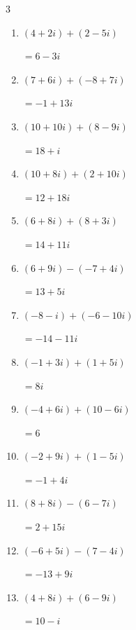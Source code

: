 \begin{multicols}{3}
\begin{enumerate}
  \item $\displaystyle (4+2i) + (2-5i)$

        $\displaystyle =6-3i$

  \item $\displaystyle (7+6i) + (-8+7i)$

        $\displaystyle =-1+13i$

  \item $\displaystyle (10+10i) + (8-9i)$

        $\displaystyle =18+i$

  \item $\displaystyle (10+8i) + (2+10i)$

        $\displaystyle =12+18i$

  \item $\displaystyle (6+8i) + (8+3i)$

        $\displaystyle =14+11i$

  \item $\displaystyle (6+9i) - (-7+4i)$

        $\displaystyle =13+5i$

\columnbreak %

\resetques

  \item $\displaystyle (-8-i) + (-6-10i)$

        $\displaystyle =-14-11i$

  \item $\displaystyle (-1+3i) + (1+5i)$

        $\displaystyle =8i$

  \item $\displaystyle (-4+6i) + (10-6i)$

        $\displaystyle =6$

  \item $\displaystyle (-2+9i) + (1-5i)$

        $\displaystyle =-1+4i$

  \item $\displaystyle (8+8i) - (6-7i)$

        $\displaystyle =2+15i$

  \item $\displaystyle (-6+5i) - (7-4i)$

        $\displaystyle =-13+9i$

  \item $\displaystyle (4+8i) + (6-9i)$

        $\displaystyle =10-i$


\end{enumerate}
\end{multicols}
